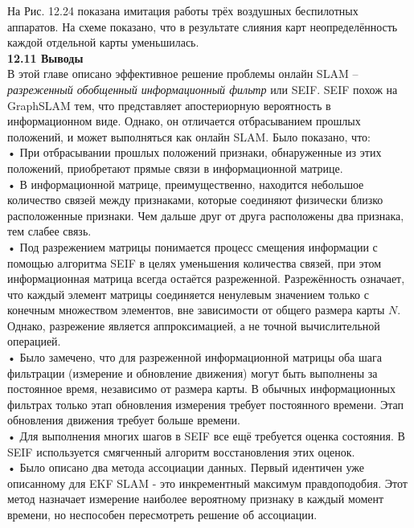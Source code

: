 \documentclass[10pt,a4paper]{article}
\begin{document}
На Рис. 12.24 показана имитация работы трёх воздушных беспилотных аппаратов. На схеме показано, что в результате слияния карт неопределённость каждой отдельной карты уменьшилась.\\

\textbf{12.11	Выводы}\\

В этой главе описано эффективное решение проблемы онлайн SLAM – \textit{разреженный обобщенный информационный фильтр} или SEIF. SEIF похож на GraphSLAM тем, что представляет апостериорную вероятность в информационном виде. Однако, он отличается отбрасыванием прошлых положений, и может выполняться как онлайн SLAM. Было показано, что:\\

•	При отбрасывании прошлых положений признаки, обнаруженные из этих положений, приобретают прямые связи в информационной матрице.\\

•	В информационной матрице, преимущественно, находится небольшое количество связей между признаками, которые соединяют физически близко расположенные признаки. Чем дальше друг от друга расположены два признака, тем слабее связь.\\

•	Под разрежением матрицы понимается процесс смещения информации с помощью алгоритма SEIF в целях уменьшения количества связей, при этом информационная матрица всегда остаётся разреженной. Разрежённость означает, что каждый элемент матрицы соединяется ненулевым значением только с конечным множеством элементов, вне зависимости от общего размера карты $N$. Однако, разрежение является аппроксимацией, а не точной вычислительной операцией.\\

•	Было замечено, что для разреженной информационной матрицы оба шага фильтрации (измерение и обновление движения) могут быть выполнены за постоянное время, независимо от размера карты. В обычных информационных фильтрах только этап обновления измерения требует постоянного времени. Этап обновления движения требует больше времени.\\

•	Для выполнения многих шагов в SEIF все ещё требуется оценка состояния. В SEIF используется смягченный алгоритм восстановления этих оценок.\\

•	Было описано два метода ассоциации данных. Первый идентичен уже описанному для EKF SLAM - это инкрементный максимум правдоподобия. Этот метод назначает измерение наиболее вероятному признаку в каждый момент времени, но неспособен пересмотреть решение об ассоциации.\\
\end{document}
